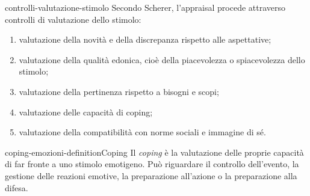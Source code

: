 \documentclass[preview]{standalone}
\begin{document}
\begin{snippet}{controlli-valutazione-stimolo}
    Secondo Scherer, l'appraisal procede attraverso controlli di valutazione
    dello stimolo:
    \begin{enumerate}
        \item valutazione della novità e della discrepanza rispetto alle
        aspettative;
        \item valutazione della qualità edonica, cioè della piacevolezza o
        spiacevolezza dello stimolo;
        \item valutazione della pertinenza rispetto a bisogni e scopi;
        \item valutazione delle capacità di coping;
        \item valutazione della compatibilità con norme sociali e immagine di sé.
    \end{enumerate}
\end{snippet}

\begin{snippetdefinition}{coping-emozioni-definition}{Coping}
    Il \emph{coping} è la valutazione delle proprie capacità di far fronte a uno
    stimolo emotigeno. Può riguardare il controllo dell'evento, la gestione delle
    reazioni emotive, la preparazione all'azione o la preparazione alla difesa.
\end{snippetdefinition}
\end{document}
